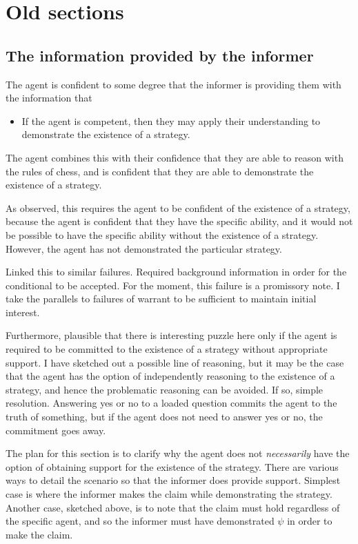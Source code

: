\documentclass[10pt]{article}
\newcommand{\hozlinedash}[0]{%
  \noindent\hdashrule[0.5ex][c]{\textwidth}{.1pt}{2.5pt}
}
\begin{document}
\newpage

\section*{Old sections}
\label{sec:old-sections}




\subsection{The information provided by the informer}
\label{sec:inform-prov-inform}


The agent is confident to some degree that the informer is providing them with the information that
\begin{itemize}
\item If the agent is competent, then they may apply their understanding to demonstrate the existence of a strategy.
\end{itemize}
The agent combines this with their confidence that they are able to reason with the rules of chess, and is confident that they are able to demonstrate the existence of a strategy.

As observed, this requires the agent to be confident of the existence of a strategy, because the agent is confident that they have the specific ability, and it would not be possible to have the specific ability without the existence of a strategy.
However, the agent has not demonstrated the particular strategy.

\hozlinedash

Linked this to similar failures.
Required background information in order for the conditional to be accepted.
For the moment, this failure is a promissory note.
I take the parallels to failures of warrant to be sufficient to maintain initial interest.

\hozlinedash

Furthermore, plausible that there is interesting puzzle here only if the agent is required to be committed to the existence of a strategy without appropriate support.
I have sketched out a possible line of reasoning, but it may be the case that the agent has the option of independently reasoning to the existence of a strategy, and hence the problematic reasoning can be avoided.
If so, simple resolution.
Answering yes or no to a loaded question commits the agent to the truth of something, but if the agent does not need to answer yes or no, the commitment goes away.

The plan for this section is to clarify why the agent does not \emph{necessarily} have the option of obtaining support for the existence of the strategy.
There are various ways to detail the scenario so that the informer does provide support.
Simplest case is where the informer makes the claim while demonstrating the strategy.
Another case, sketched above, is to note that the claim must hold regardless of the specific agent, and so the informer must have demonstrated \(\psi\) in order to make the claim.
\end{document}
